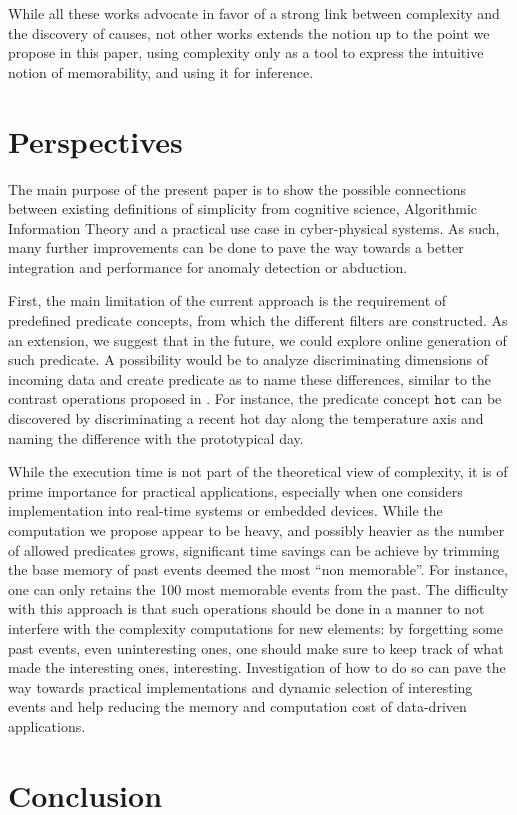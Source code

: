 \documentclass[conference]{IEEEtran}
\begin{document}
While all these works advocate in favor of a strong link between complexity and the
discovery of causes, not other works extends the notion up to the point we propose in this paper, using complexity only as a tool to express the intuitive notion of memorability, and using it for inference.

\section{Perspectives}
\label{sec:future}
The main purpose of the present paper is to show the possible connections
between existing definitions of simplicity from cognitive science, Algorithmic
Information Theory and a practical use case in cyber-physical systems. As such,
many further improvements can be done to pave the way towards a better
integration and performance for anomaly detection or abduction.

First, the main limitation of the current approach is the requirement of
predefined predicate concepts, from which the different filters are constructed.
As an extension, we suggest that in the future, we could explore online
generation of such predicate. A possibility would be to analyze discriminating
dimensions of incoming data and create predicate as to name these differences,
similar to the contrast operations proposed in \cite{dessalles_conceptual_2015,
  gardenfors2004conceptual}. For instance, the predicate concept $\mathtt{hot}$
can be discovered by discriminating a recent hot day along the
temperature axis and naming the difference with the prototypical day.

While the execution time is not part of the theoretical view of complexity, it
is of prime importance for practical applications, especially when one considers
implementation into real-time systems or embedded devices. While the computation
we propose appear to be heavy, and possibly heavier as the number of allowed
predicates grows, significant time savings can be achieve by trimming the base
memory of past events deemed the most ``non memorable''. For instance, one can
only retains the 100 most memorable events from the past. The difficulty with
this approach is that such operations should be done in a manner to not
interfere with the complexity computations for new elements: by forgetting some
past events, even uninteresting ones, one should make sure to keep track of what
made the interesting ones, interesting. Investigation of how to do so can pave
the way towards practical implementations and dynamic selection of interesting
events and help reducing the memory and computation cost of data-driven applications.


\section{Conclusion}




\end{document}
